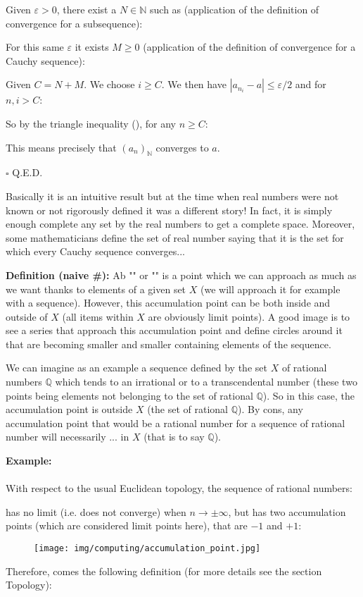 	\begin{dem}
	Given $\varepsilon>0$, there exist a $N\in \mathbb{N}$ such as (application of the definition of convergence for a subsequence):
	
	For this same $\varepsilon$ it exists $M\geq 0$ (application of the definition of convergence for a Cauchy sequence):
	
	Given $C=N+M$. We choose $i\geq C$. We then have $|a_{n_i}-a|\leq \varepsilon/2$ and for $n,i>C$:
	
	So by the triangle inequality (), for any $n\geq C$:
	
	This means precisely that $(a_n)_\mathbb{N}$ converges to $a$.
	\begin{flushright}
		$\square$  Q.E.D.
	\end{flushright}
	\end{dem}
	Basically it is an intuitive result but at the time when real numbers were not known or not rigorously defined it was a different story! In fact, it is simply enough complete any set by the real numbers to get a complete space. Moreover, some mathematicians define the set of real number saying that it is the set for which every Cauchy sequence converges...
	
	\textbf{Definition (naive \#\mydef):} Ab "" or "" is a point which we can approach as much as we want thanks to elements of a given set $X$ (we will approach it for example with a sequence). However, this accumulation point can be both inside and outside of $X$ (all items within $X$ are obviously limit points). A good image is to see a series that approach this accumulation point and define circles around it that are becoming smaller and smaller containing elements of the sequence.
	
	We can imagine as an example a sequence defined by the set $X$ of rational numbers $\mathbb{Q}$ which tends to an irrational or to a transcendental number (these two points being elements not belonging to the set of rational $\mathbb{Q}$). So in this case, the accumulation point is outside $X$ (the set of rational $\mathbb{Q}$). By cons, any accumulation point that would be a rational number for a sequence of rational number will necessarily ... in $X$ (that is to say $\mathbb{Q}$).
	
	\begin{tcolorbox}[colframe=black,colback=white,sharp corners]
	\textbf{{\Large {}}Example:}\\\\
	With respect to the usual Euclidean topology, the sequence of rational numbers:
	
	has no limit (i.e. does not converge) when $n\rightarrow \pm \infty$, but has two accumulation points (which are considered limit points here), that are $-1$ and $+1$:
	\begin{figure}[H]
		\centering
		\texttt{[image: img/computing/accumulation\_point.jpg]}
	\end{figure}
	\end{tcolorbox}
	Therefore, comes the following definition (for more details see the section Topology):
	
